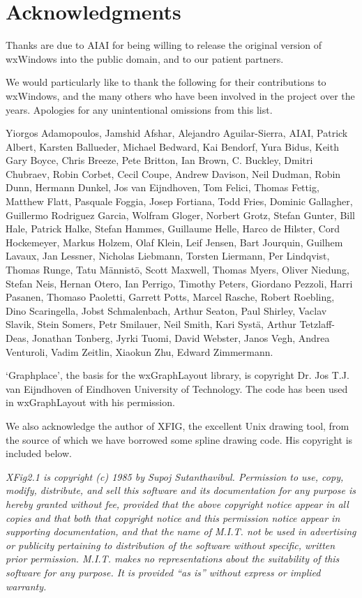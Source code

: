 \section{Acknowledgments}

Thanks are due to AIAI for being willing to release the original version of
wxWindows into the public domain, and to our patient partners.

We would particularly like to thank the following for their contributions to wxWindows, and the many others who have been involved in
the project over the years. Apologies for any unintentional omissions from this list. 
 
Yiorgos Adamopoulos, Jamshid Afshar, Alejandro Aguilar-Sierra, AIAI, Patrick Albert, Karsten Ballueder, Michael Bedward, Kai Bendorf, Yura Bidus, Keith 
Gary Boyce, Chris Breeze, Pete Britton, Ian Brown, C. Buckley, Dmitri Chubraev, Robin Corbet, Cecil Coupe, Andrew Davison, Neil Dudman, Robin 
Dunn, Hermann Dunkel, Jos van Eijndhoven, Tom Felici, Thomas Fettig, Matthew Flatt, Pasquale Foggia, Josep Fortiana, Todd Fries, Dominic Gallagher, 
Guillermo Rodriguez Garcia, Wolfram Gloger, Norbert Grotz, Stefan Gunter, Bill Hale, Patrick Halke, Stefan Hammes, Guillaume Helle, Harco de Hilster, Cord Hockemeyer, Markus 
Holzem, Olaf Klein, Leif Jensen, Bart Jourquin, Guilhem Lavaux, Jan Lessner, Nicholas Liebmann, Torsten Liermann, Per Lindqvist, Thomas Runge, Tatu
M\"{a}nnist\"{o}, Scott Maxwell, Thomas Myers, Oliver Niedung, Stefan Neis, Hernan Otero, Ian Perrigo, Timothy Peters, Giordano Pezzoli, Harri Pasanen, Thomaso Paoletti, 
Garrett Potts, Marcel Rasche, Robert Roebling, Dino Scaringella, Jobst Schmalenbach, Arthur Seaton, Paul Shirley, Vaclav Slavik, Stein Somers, Petr Smilauer, Neil Smith, 
Kari Syst\"{a}, Arthur Tetzlaff-Deas, Jonathan Tonberg, Jyrki Tuomi, David Webster, Janos Vegh, Andrea Venturoli, Vadim Zeitlin, Xiaokun Zhu, Edward Zimmermann.

`Graphplace', the basis for the wxGraphLayout library, is copyright Dr. Jos
T.J. van Eijndhoven of Eindhoven University of Technology. The code has
been used in wxGraphLayout with his permission.

We also acknowledge the author of XFIG, the excellent Unix drawing tool,
from the source of which we have borrowed some spline drawing code.
His copyright is included below.

{\it XFig2.1 is copyright (c) 1985 by Supoj Sutanthavibul. Permission to
use, copy, modify, distribute, and sell this software and its
documentation for any purpose is hereby granted without fee, provided
that the above copyright notice appear in all copies and that both that
copyright notice and this permission notice appear in supporting
documentation, and that the name of M.I.T. not be used in advertising or
publicity pertaining to distribution of the software without specific,
written prior permission.  M.I.T. makes no representations about the
suitability of this software for any purpose.  It is provided ``as is''
without express or implied warranty.}

